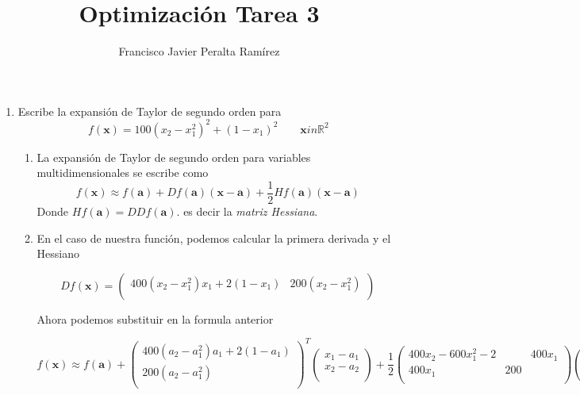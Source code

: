 \documentclass{article}
\title {Optimización Tarea 3}
\author {Francisco Javier Peralta Ramírez}
\date{\vspace{-2ex}}
\begin{document}
\maketitle

\begin{enumerate}
\item Escribe la expansión de Taylor de segundo orden para
$$f(\boldsymbol{x}) = 100(x_2-x_1^2)^2 + (1 - x_1)^2 \qquad \boldsymbol{x} in \mathbb{R}^2$$
\begin{enumerate}
\item La expansión de Taylor de segundo orden para variables multidimensionales se escribe como
$$f(\boldsymbol{x}) \approx f(\boldsymbol{a}) + Df(\boldsymbol{a})(\boldsymbol{x - a}) + \frac{1}{2}Hf(\boldsymbol{a})(\boldsymbol{x - a})$$
Donde $Hf(\boldsymbol{a}) = DDf(\boldsymbol{a}).$ es decir la \emph{matriz Hessiana}.
\item En el caso de nuestra función, podemos calcular la primera derivada y el Hessiano

$$
Df(\boldsymbol{x})= 
 \begin{pmatrix}
  400(x_2 - x_1^2)x_1 + 2(1 - x_1) &
  200(x_2 - x_1^2)\\
 \end{pmatrix}
$$




Ahora podemos substituir en la formula anterior 

$$f(\boldsymbol{x}) \approx f(\boldsymbol{a}) + \begin{pmatrix}
  400(a_2 - a_1^2)a_1 + 2(1 - a_1) \\
  200(a_2 - a_1^2)\\
 \end{pmatrix}^T
 \begin{pmatrix}
  x_1 - a_1\\
  x_2 - a_2\\
 \end{pmatrix} + \frac{1}{2} \begin{pmatrix}
  400 x_2 - 600x_1^2 - 2 && 400x_1\\
  400x_1 & 200\\
 \end{pmatrix}\begin{pmatrix}
  x_1 - a_1\\
  x_2 - a_2\\
 \end{pmatrix}$$

\end{enumerate}


\end{enumerate}
\end{document}
